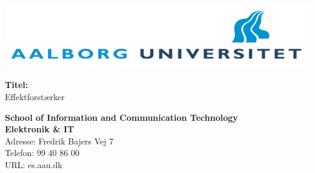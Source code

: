 \begin{multicols}{2}
\includegraphics[scale=0.35]{forside/aau.png}

\small{\textbf{Titel:\\}
Effektforstærker}

\scriptsize{\textbf{School of Information and Communication Technology\\ Elektronik \& IT\\}
Adresse: Fredrik Bajers Vej 7\\
Telefon: 99 40 86 00\\
URL: es.aau.dk \\}
\end{multicols}
